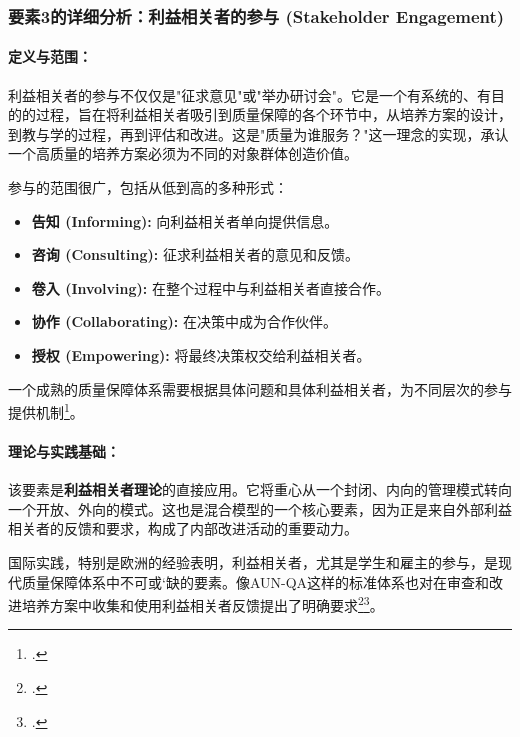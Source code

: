 \subsubsection{要素3的详细分析：利益相关者的参与 (Stakeholder Engagement)}
\label{subsubsec:thanh_to_3}

\paragraph{定义与范围：}
利益相关者的参与不仅仅是"征求意见"或"举办研讨会"。它是一个有系统的、有目的的过程，旨在将利益相关者吸引到质量保障的各个环节中，从培养方案的设计，到教与学的过程，再到评估和改进。这是"质量为谁服务？"这一理念的实现，承认一个高质量的培养方案必须为不同的对象群体创造价值。

参与的范围很广，包括从低到高的多种形式：
\begin{itemize}
    \item \textbf{告知 (Informing):} 向利益相关者单向提供信息。
    \item \textbf{咨询 (Consulting):} 征求利益相关者的意见和反馈。
    \item \textbf{卷入 (Involving):} 在整个过程中与利益相关者直接合作。
    \item \textbf{协作 (Collaborating):} 在决策中成为合作伙伴。
    \item \textbf{授权 (Empowering):} 将最终决策权交给利益相关者。
\end{itemize}
一个成熟的质量保障体系需要根据具体问题和具体利益相关者，为不同层次的参与提供机制\footcite{Arnstein1969}。

\paragraph{理论与实践基础：}
该要素是\textbf{利益相关者理论}的直接应用。它将重心从一个封闭、内向的管理模式转向一个开放、外向的模式。这也是混合模型的一个核心要素，因为正是来自外部利益相关者的反馈和要求，构成了内部改进活动的重要动力。

国际实践，特别是欧洲的经验表明，利益相关者，尤其是学生和雇主的参与，是现代质量保障体系中不可或`缺的要素。像AUN-QA这样的标准体系也对在审查和改进培养方案中收集和使用利益相关者反馈提出了明确要求\footcite{ENQA_Stakeholder2018}\footcite{AUN-QAGuide}。

